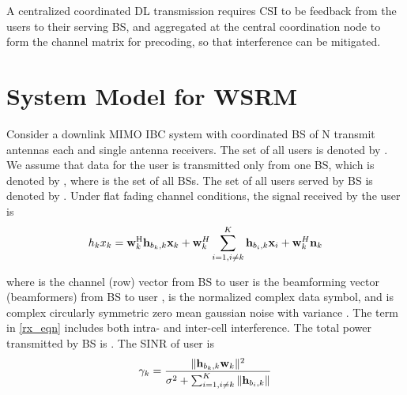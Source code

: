 


A centralized coordinated \ac{DL} transmission requires \ac{CSI} to be feedback from the users to their serving \ac{BS}, and aggregated at the central coordination node to form the channel matrix for precoding, so that interference can be mitigated.


\section{System Model for \ac{WSRM} }

Consider a downlink \ac{MIMO} \ac{IBC} system with  coordinated \ac{BS} of N transmit antennas each and  single antenna receivers. The set of all  users is denoted by . We assume that data for the  user is transmitted only from one BS, which is denoted by , where  is the set of all \acsp{BS}. The set of all users served by BS  is denoted by . Under flat fading channel conditions, the signal received by the  user is
\begin{equation}
h_k{x}_k = \mathbf{w}^{\mathrm{H}}_{k} \mathbf{h}_{{b_k},k} \mathbf{x}_k  + \mathbf{w}^H_k \sum_{i = 1, i \neq k}^{K} \mathbf{h}_{{b_i},k} \mathbf{x}_i + \mathbf{w}^H_k \mathbf{n}_k
\label{cent1_eqn}
\end{equation}

where  is the channel (row) vector from BS  to user  is the beamforming vector (beamformers) from BS  to user ,  is the normalized complex data symbol, and  is complex circularly symmetric zero mean gaussian noise with variance . The term  in \eqref{rx_eqn} includes both intra- and inter-cell interference. The total power transmitted by \acs{BS}  is . The \acs{SINR}  of user  is
\begin{equation}
\gamma_k = \frac{ \|\mathbf{h}_{b_k,k} \mathbf{w}_k\|^{2}}{\sigma^{2}+\sum_{i = 1, i \neq k}^{K} \|\mathbf{h}_{{b_i},k}\|}
\label{cent2_eqn}
\end{equation}

